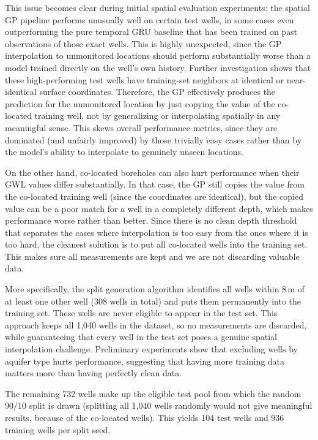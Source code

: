 This issue becomes clear during initial spatial evaluation experiments: the spatial GP
pipeline performs unusually well on certain test wells, in some cases even outperforming
the pure temporal GRU baseline that has been trained on past observations of those exact wells.
This is highly unexpected, since the GP interpolation to unmonitored locations should perform
substantially worse than a model trained directly on the well's own history. Further investigation
shows that these high-performing test wells have training-set neighbors at identical or
near-identical surface coordinates. Therefore, the GP effectively produces the prediction for
the unmonitored location by just copying the value of the co-located training well, not by
generalizing or interpolating spatially in any meaningful sense. This skews overall performance
metrics, since they are dominated (and unfairly improved) by those trivially easy cases rather
than by the model's ability to interpolate to genuinely unseen locations.

On the other hand, co-located boreholes can also hurt performance when their GWL values differ substantially. In that case, the GP still copies the value from the co-located training 
well (since the coordinates are identical), but the copied value can be a poor match for a well
in a completely different depth, which makes performance worse rather than better. Since there is 
no clean depth threshold that separates the cases where interpolation is too easy from the ones
where it is too hard, the cleanest solution is to put all co-located wells into the
training set. This makes sure all measurements are kept and we are not discarding valuable data.

More specifically, the split generation algorithm identifies all wells within 8\,m of at least
one other well (308 wells in total) and puts them permanently into the training set. These
wells are never eligible to appear in the test set.
This approach keeps all 1{,}040 wells in the dataset,
so no measurements are discarded, while guaranteeing that every well in the test set poses a genuine
spatial interpolation challenge. Preliminary experiments show that excluding wells by aquifer
type hurts performance, suggesting that having more training data matters more than having
perfectly clean data.

The remaining 732 wells make up the eligible test pool from which the random 90/10 split is drawn
(splitting all 1{,}040 wells randomly would not give meaningful results, because of the co-located wells).
This yields 104 test wells and 936 training wells per split seed.

